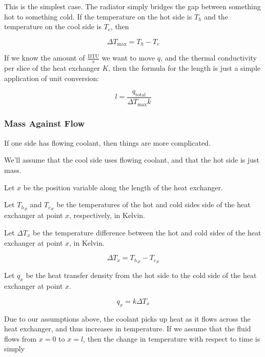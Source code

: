 \documentclass{article}
\numberwithin{equation}{subsection}
\theoremstyle{remark}
\newcommand{\qtotal}{q_{\mathrm{total}}}
\newcommand{\DeltaT}{\Delta{}T}
\newcommand{\DeltaTmax}{\DeltaT_{\mathrm{max}}}
\begin{document}
This is the simplest case.
The radiator simply bridges the gap between something hot to something cold.
If the temperature on the hot side is \(T_{h}\) and the temperature on the cool side is \(T_{c}\), then

\begin{equation}
\DeltaTmax = T_{h} - T_{c}
\end{equation}

If we know the amount of \(\frac{\mathrm{DTU}}{\mathrm{s}}\) we want to move \(q\), and the thermal conductivity per slice of the heat exchanger \(K\), then the formula for the length is just a simple application of unit conversion:

\begin{equation}
l = \frac{\qtotal}{\DeltaTmax k}
\end{equation}

\subsubsection{Mass Against Flow}

If one side has flowing coolant, then things are more complicated.

We'll assume that the cool side uses flowing coolant, and that the hot side is just mass.

Let \(x\) be the position variable along the length of the heat exchanger.

Let \({T_{h}}_{x}\) and \({T_{c}}_{x}\) be the temperatures of the hot and cold sides side of the heat exchanger at point \(x\), respectively, in Kelvin.

Let \(\DeltaT_{x}\) be the temperature difference between the hot and cold sides of the heat exchanger at point \(x\), in Kelvin.

\begin{equation}
\DeltaT_{x} = {T_{h}}_{x} - {T_{c}}_{x}
\end{equation}

Let \(q_{x}\) be the heat transfer density from the hot side to the cold side of the heat exchanger at point \(x\).

\begin{equation}
q_{x} = k \DeltaT_{x}
\end{equation}

Due to our assumptions above, the coolant picks up heat as it flows across the heat exchanger, and thus increases in temperature.
If we assume that the fluid flows from \(x = 0\) to \(x = l\), then the change in temperature with respect to time is simply
\end{document}
